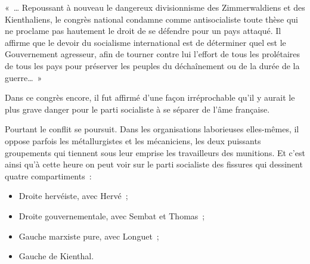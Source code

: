 \documentclass[french,twoside]{book} %
\newenvironment{quoteblock}%
  {\begin{quoting}}
  {\end{quoting}}
\newenvironment{quotebar}{%
    \def\FrameCommand{{\color{rubric!10!}\vrule width 0.5em} \hspace{0.9em}}%
    \def\OuterFrameSep{\itemsep} %
    \MakeFramed {\advance\hsize-\width \FrameRestore}
  }%
  {%
    \endMakeFramed
  }
\renewenvironment{quoteblock}%
  {%
    \savenotes
    \setstretch{0.9}
    \normalfont
    \begin{quotebar}
  }
  {%
    \end{quotebar}
    \spewnotes
  }
\begin{document}
\begin{quoteblock}
 \noindent « … Repoussant à nouveau le dangereux divisionnisme des Zimmerwaldiens et des Kienthaliens, le congrès national condamne comme antisocialiste toute thèse qui ne proclame pas hautement le droit de se défendre pour un pays attaqué. Il affirme que le devoir du socialisme international est de déterminer quel est le Gouvernement agresseur, afin de tourner contre lui l’effort de tous les prolétaires de tous les pays pour préserver les peuples du déchaînement ou de la durée de la guerre… »‌
 \end{quoteblock}

\noindent Dans ce congrès encore, il fut affirmé d’une façon irréprochable qu’il y aurait le plus grave danger pour le parti socialiste à se séparer de l’âme française.‌\par
Pourtant le conflit se poursuit. Dans les organisations laborieuses elles-mêmes, il oppose parfois les métallurgistes et les mécaniciens, les deux puissants groupements qui tiennent sous leur emprise les travailleurs des munitions. Et c’est ainsi qu’à cette heure on peut voir sur le parti socialiste des fissures qui dessinent quatre compartiments :‌\par

\begin{itemize}[itemsep=0pt,]
\item Droite hervéiste, avec Hervé ;‌
\item Droite gouvernementale, avec Sembat et Thomas ;‌
\item Gauche marxiste pure, avec Longuet ;‌
\item Gauche de Kienthal.
\end{itemize}
\end{document}
